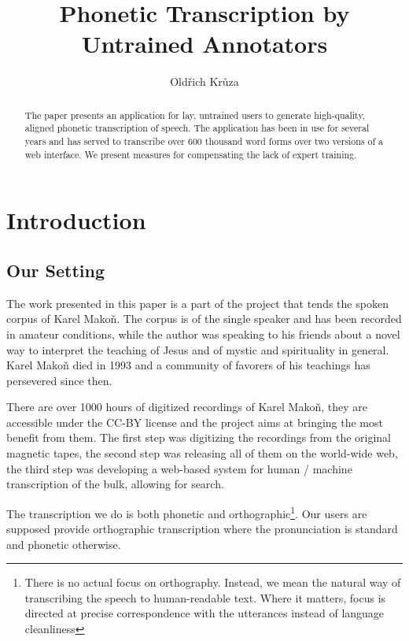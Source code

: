 \documentclass{itatnew}
\begin{document}
\title{Phonetic Transcription by Untrained Annotators}

\author{Oldřich Krůza}


\maketitle              %

\begin{abstract}
The paper presents an application for lay, untrained users to generate
high-quality, aligned phonetic transcription of speech. The application has been in use
for several years and has served to transcribe over 600 thousand word forms over
two versions of a web interface. We present measures for compensating the lack of expert training.
\end{abstract}

\section{Introduction}

\subsection{Our Setting}

The work presented in this paper is a part of the project that tends the spoken
corpus of Karel Mako\v{n}\cite{hajek2007cesky}. The corpus is of the single
speaker and has been recorded in amateur conditions, while the author was
speaking to his friends about a novel way to interpret the teaching of Jesus and
of mystic and spirituality in general. Karel Makoň died in 1993 and a community
of favorers of his teachings has persevered since then.

There are over 1000 hours of digitized recordings of Karel Makoň, they are
accessible under the CC-BY license and the project aims at bringing the most
benefit from them. The first step was digitizing the recordings from the
original magnetic tapes, the second step was releasing all of them on the
world-wide web, the third step was developing a web-based system for human /
machine transcription of the bulk, allowing for search.

The transcription we do is both phonetic and orthographic\footnote{There is no
actual focus on orthography. Instead, we mean the natural way of transcribing the
speech to human-readable text. Where it matters, focus is directed at precise
correspondence with the utterances instead of language cleanliness}. Our users
are supposed provide orthographic transcription where the pronunciation is
standard and phonetic otherwise.
\end{document}
